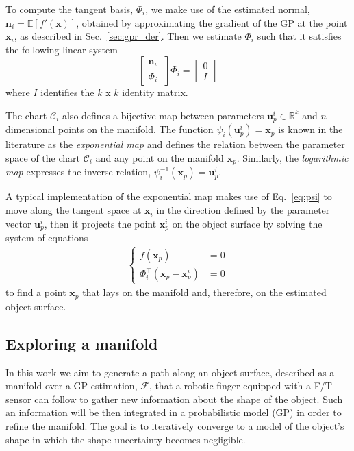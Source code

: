 To compute the tangent basis, $\Phi_i$, we make use of the estimated normal, $\mathbf{n}_i=\mathbb{E}[f'(\mathbf{x})]$, obtained by approximating the gradient of the GP at the point $\mathbf{x}_i$, as described in Sec.~\ref{sec:gpr_der}. Then we estimate $\Phi_i$ such that it satisfies the following linear system
$$
\left[
\begin{array}{c}
\mathbf{n}_i \\
\Phi_i^\top
\end{array}\right]\Phi_i
=
\left[
\begin{array}{c}
0 \\
I
\end{array}\right]
$$  
where $I$ identifies the $k\text{ x }k$ identity matrix.  

The chart $\mathcal{C}_i$ also defines a bijective map between parameters $\mathbf{u}_p^i\in\mathbb{R}^k$ and $n$-dimensional points on the manifold. The function $\psi_i(\mathbf{u}_p^i)=\mathbf{x}_p$ is known in the literature as the \emph{exponential map} and defines the relation between the parameter space of the chart $\mathcal{C}_i$ and any point on the manifold $\mathbf{x}_p$. Similarly, the \emph{logarithmic map} expresses the inverse relation, $\psi_i^{-1}(\mathbf{x}_p)= \mathbf{u}_p^i$.

A typical implementation of the exponential map makes use of Eq.~\ref{eq:psi} to move along the tangent space at $\mathbf{x}_i$ in the direction defined by the parameter vector $\mathbf{u}_p^i$, then it projects the point $\mathbf{x}_p^i$ on the object surface by solving the system of equations
\begin{align}
\label{eq:projection}
\begin{cases}
f(\mathbf{x}_p)&=0\\
\Phi_i^\top(\mathbf{x}_p-\mathbf{x}_p^i)&=0
\end{cases}
\end{align}
to find a point $\mathbf{x}_p$ that lays on the manifold and, therefore, on the estimated object surface. 

\subsection{Exploring a manifold}

In this work we aim to generate a path along an object surface, described as a manifold over a GP estimation, $\mathcal{F}$, that a robotic finger equipped with a F/T sensor can follow to gather new information about the shape of the object. Such an information will be then integrated in a probabilistic model (GP) in order to refine the manifold. The goal is to iteratively converge to a model of the object's shape in which the shape uncertainty becomes negligible. 

